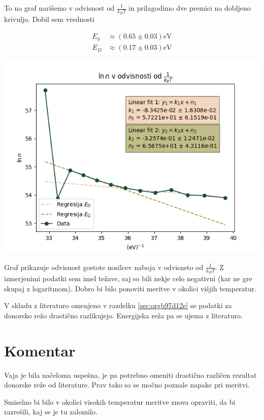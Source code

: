 \documentclass[11pt]{article}
\begin{document}
To na graf narišemo v odvisnost od \(\frac{1}{k_B T}\) in prilagodimo dve premici na dobljeno krivuljo. Dobil sem vrednosti

\begin{align*}
  E_g &\approx (0.65 \pm 0.03) \mathrm{eV} \\
E_D &\approx (0.17 \pm 0.03) \mathrm{eV}
\end{align*}

\begin{slika}[H]
  \centering
  \includegraphics[width=.9\linewidth]{figures/logaritemgraf.png}
  \caption{\small Graf prikazuje odvisnost gostote nosilcev naboja v odvisnsto od $\frac{1}{k_{B}T}$. Z izmerjenimi podatki sem imel težave, saj so bili nekje celo negativni (kar ne gre skupaj z logaritmom). Dobro bi bilo ponoviti meritve v okolici višjih temperatur.}
\end{slika}

V skladu z literaturo omenjeno v razdelku \ref{sec:orgb97d12e} se podatki za donorsko režo drastično razlikujejo. Energijska reža pa se ujema z literaturo.


\section{Komentar}\label{sec:org24f504a}

Vaja je bila načeloma uspešna, je pa potrebno omeniti drastično različen rezultat donorske reže od literature. Prav tako so se močno poznale napake pri meritvi.

Smiselno bi bilo v okolici visokih temperatur meritve znova opraviti, da bi razrešili, kaj se je tu zalomilo.
\end{document}
